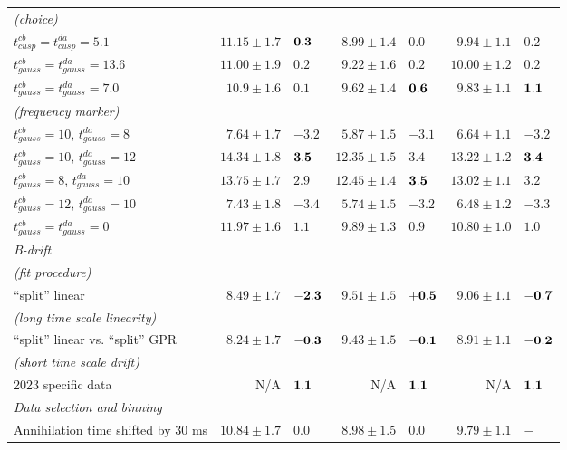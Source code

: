 \begin{table}[!h]
{\begin{tabular}{l||r|l||r|l||r|l}
{\it (choice)} & & & & & & \\
$t_{cusp}^{cb}=t_{cusp}^{da}=5.1$	    & $11.15 \pm 1.7 $ & ${\bf 0.3 } $ & $8.99 \pm 1.4 $ & $ 0.0$       & $ 9.94 \pm 1.1$ & $0.2$ \\
$t_{gauss}^{cb}=t_{gauss}^{da}=13.6$	& $11.00 \pm 1.9 $ & $ 0.2 $       & $9.22 \pm 1.6 $ & $ 0.2 $      & $10.00 \pm 1.2$ & $0.2$ \\
$t_{gauss}^{cb}=t_{gauss}^{da}=7.0$	    & $10.9  \pm 1.6 $ & $ 0.1 $       & $9.62 \pm 1.4 $ & $ {\bf 0.6}$ & $9.83  \pm 1.1$ & ${\bf 1.1}$  \\
\hline
{\it (frequency marker)} & & & & & & \\
$t_{gauss}^{cb}=10$, $t_{gauss}^{da}=8$	 & $7.64 \pm 1.7 $   & $ -3.2$      & $5.87 \pm 1.5 $   & $ -3.1$       & $6.64 \pm 1.1$ & $-3.2$ \\
$t_{gauss}^{cb}=10$, $t_{gauss}^{da}=12$ & $14.34 \pm 1.8 $  & ${\bf 3.5 }$ & $12.35 \pm 1.5 $  & $ 3.4$        & $13.22 \pm 1.2$& ${\bf 3.4}$  \\
$t_{gauss}^{cb}=8$, $t_{gauss}^{da}=10$	 & $13.75 \pm 1.7 $  & $ 2.9 $      & $12.45 \pm 1.4 $  & $ {\bf 3.5 }$ & $13.02 \pm 1.1$& $3.2$  \\
$t_{gauss}^{cb}=12$, $t_{gauss}^{da}=10$ & $7.43 \pm 1.8 $   & $ -3.4 $     & $5.74 \pm 1.5 $   & $ -3.2$       & $6.48 \pm 1.2$ & $-3.3$ \\
$t_{gauss}^{cb}=t_{gauss}^{da}=0$        & $11.97 \pm 1.6 $  & $ 1.1$       & $9.89 \pm 1.3 $   & $0.9 $        & $10.80 \pm 1.0$& $1.0$   \\
\hline 
\hline
{\it B-drift} & & & & & & \\	
{\it (fit procedure)} & & & & & & \\	
``split'' linear                           & $8.49 \pm 1.7$ & ${\bf -2.3}	$& $9.51 \pm 1.5$ & $ {\bf +0.5}	$& $9.06 \pm 1.1$ & ${\bf -0.7}$ \\
\hline 
{\it (long time scale linearity)} & & & & & & \\	
``split'' linear vs. ``split'' GPR         &  $8.24 \pm 1.7$  & ${\bf -0.3}	$&$9.43 \pm 1.5$   & $ {\bf -0.1}	$& $8.91 \pm 1.1$ & ${\bf -0.2}$ \\
\hline 
{\it (short time scale drift)} & & & & & & \\	
2023 specific data & N/A & ${\bf 1.1} $ & N/A & $ {\bf 1.1} $ & N/A & $ {\bf 1.1} $ \\
\hline
\hline 
{\it Data selection and binning} & & & & & & \\
Annihilation time shifted by 30 ms	       & $10.84 \pm 1.7 $  & $0.0$ &  $8.98 \pm 1.5 $ & $	0.0	$ & $ 9.79 \pm 1.1$  & $ - $\\

\end{tabular}}
\end{table}

